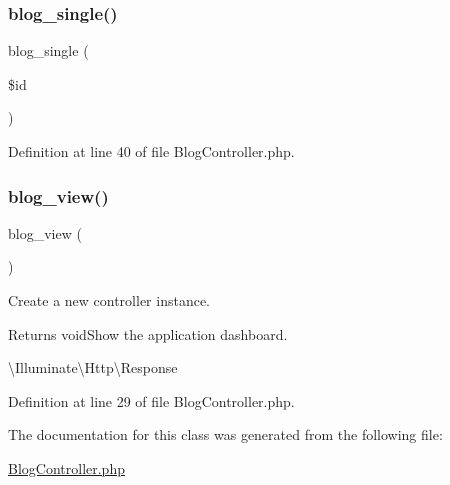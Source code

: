 \subsubsection{\texorpdfstring{blog\_single()}{blog\_single()}}
{\footnotesize\ttfamily blog\+\_\+single (\begin{DoxyParamCaption}\item[{}]{\$id }\end{DoxyParamCaption})}



Definition at line 40 of file Blog\+Controller.\+php.

\mbox{\label{class_responsive_1_1_http_1_1_controllers_1_1_blog_controller_a358452728e6fd2f68f038c7ab24c63b6}} 
\subsubsection{\texorpdfstring{blog\_view()}{blog\_view()}}
{\footnotesize\ttfamily blog\+\_\+view (\begin{DoxyParamCaption}{ }\end{DoxyParamCaption})}

Create a new controller instance.

\begin{DoxyReturn}{Returns}
void\+Show the application dashboard.

\textbackslash{}\+Illuminate\textbackslash{}\+Http\textbackslash{}\+Response 
\end{DoxyReturn}


Definition at line 29 of file Blog\+Controller.\+php.



The documentation for this class was generated from the following file\+:\begin{DoxyCompactItemize}
\item 
\mbox{\hyperlink{_blog_controller_8php}{Blog\+Controller.\+php}}\end{DoxyCompactItemize}
